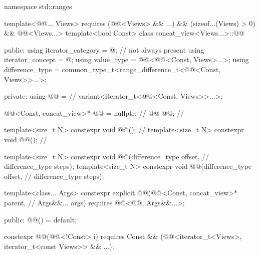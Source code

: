 %
%
\begin{codeblock}
namespace std::ranges {
  template<@@... Views>
    requires (@@<Views> && ...) && (sizeof...(Views) > 0) &&
              @@<Views...>
  template<bool Const>
  class concat_view<Views...>::@@ {
  public:
    using iterator_category = @\seebelow@;                                // not always present
    using iterator_concept = @\seebelow@;
    using value_type = @@<@@<Const, Views>...>;
    using difference_type = common_type_t<range_difference_t<@@<Const, Views>>...>;

  private:
    using @@ =                                                       // \expos
      variant<iterator_t<@@<Const, Views>>...>;

    @@<Const, concat_view>* @@ = nullptr;                     // \expos
    @@ @@;                                                          // \expos

    template<size_t N>
      constexpr void @@();                                             // \expos
    template<size_t N>
      constexpr void @@();                                                // \expos

    template<size_t N>
      constexpr void @@(difference_type offset,                    // \expos
                                 difference_type steps);
    template<size_t N>
      constexpr void @@(difference_type offset,                    // \expos
                                 difference_type steps);

    template<class... Args>
      constexpr explicit @@(@@<Const, concat_view>* parent,  // \expos
                                  Args&&... args)
        requires @@<@@, Args&&...>;

  public:
    @@() = default;

    constexpr @@(@@<!Const> i)
      requires Const && (@@<iterator_t<Views>, iterator_t<const Views>> && ...);

}}
\end{codeblock}
